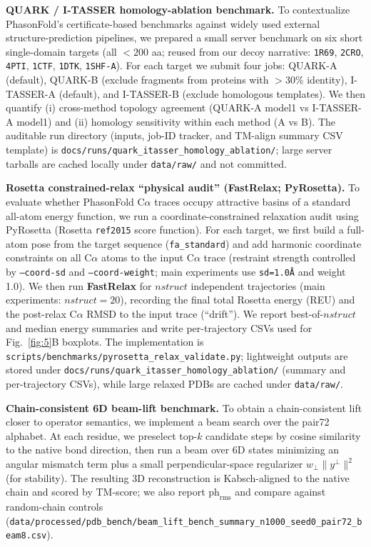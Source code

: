 \textbf{QUARK / I-TASSER homology-ablation benchmark.} To contextualize PhasonFold's certificate-based benchmarks against widely used external structure-prediction pipelines, we prepared a small server benchmark on six short single-domain targets (all $<200$ aa; reused from our decoy narrative: \texttt{1R69}, \texttt{2CRO}, \texttt{4PTI}, \texttt{1CTF}, \texttt{1DTK}, \texttt{1SHF-A}). For each target we submit four jobs: QUARK-A (default), QUARK-B (exclude fragments from proteins with $>$30\% identity), I-TASSER-A (default), and I-TASSER-B (exclude homologous templates). We then quantify (i) cross-method topology agreement (QUARK-A model1 vs I-TASSER-A model1) and (ii) homology sensitivity within each method (A vs B). The auditable run directory (inputs, job-ID tracker, and TM-align summary CSV template) is \texttt{docs/runs/quark\_itasser\_homology\_ablation/}; large server tarballs are cached locally under \texttt{data/raw/} and not committed.

\textbf{Rosetta constrained-relax ``physical audit'' (FastRelax; PyRosetta).} To evaluate whether PhasonFold C$\alpha$ traces occupy attractive basins of a standard all-atom energy function, we run a coordinate-constrained relaxation audit using PyRosetta (Rosetta \texttt{ref2015} score function). For each target, we first build a full-atom pose from the target sequence (\texttt{fa\_standard}) and add harmonic coordinate constraints on all C$\alpha$ atoms to the input C$\alpha$ trace (restraint strength controlled by \texttt{--coord-sd} and \texttt{--coord-weight}; main experiments use \texttt{sd=1.0\AA} and weight 1.0). We then run \textbf{FastRelax} for $nstruct$ independent trajectories (main experiments: $nstruct=20$), recording the final total Rosetta energy (REU) and the post-relax C$\alpha$ RMSD to the input trace (``drift''). We report best-of-$nstruct$ and median energy summaries and write per-trajectory CSVs used for Fig.~\ref{fig:5}B boxplots. The implementation is \texttt{scripts/benchmarks/pyrosetta\_relax\_validate.py}; lightweight outputs are stored under \texttt{docs/runs/quark\_itasser\_homology\_ablation/} (summary and per-trajectory CSVs), while large relaxed PDBs are cached under \texttt{data/raw/}.

\textbf{Chain-consistent 6D beam-lift benchmark.} To obtain a chain-consistent lift closer to operator semantics, we implement a beam search over the pair72 alphabet. At each residue, we preselect top-$k$ candidate steps by cosine similarity to the native bond direction, then run a beam over 6D states minimizing an angular mismatch term plus a small perpendicular-space regularizer $w_{\perp}\|y^{\perp}\|^2$ (for stability). The resulting 3D reconstruction is Kabsch-aligned to the native chain and scored by TM-score; we also report $\mathrm{ph}_{\mathrm{rms}}$ and compare against random-chain controls (\texttt{data/processed/pdb\_bench/beam\_lift\_bench\_summary\_n1000\_seed0\_pair72\_beam8.csv}).

